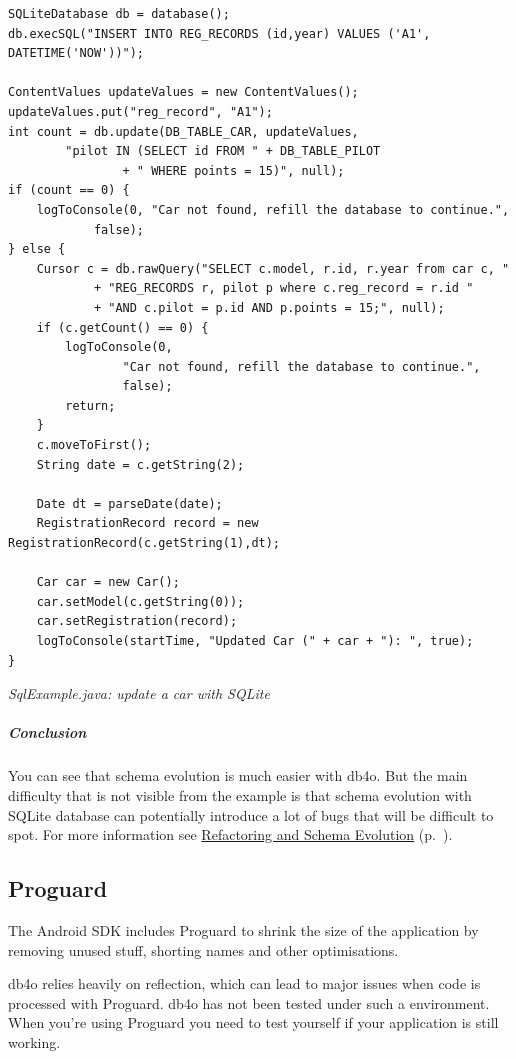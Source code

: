 \begin{lstlisting}
SQLiteDatabase db = database();
db.execSQL("INSERT INTO REG_RECORDS (id,year) VALUES ('A1', DATETIME('NOW'))");

ContentValues updateValues = new ContentValues();
updateValues.put("reg_record", "A1");
int count = db.update(DB_TABLE_CAR, updateValues,
        "pilot IN (SELECT id FROM " + DB_TABLE_PILOT
                + " WHERE points = 15)", null);
if (count == 0) {
    logToConsole(0, "Car not found, refill the database to continue.",
            false);
} else {
    Cursor c = db.rawQuery("SELECT c.model, r.id, r.year from car c, "
            + "REG_RECORDS r, pilot p where c.reg_record = r.id "
            + "AND c.pilot = p.id AND p.points = 15;", null);
    if (c.getCount() == 0) {
        logToConsole(0,
                "Car not found, refill the database to continue.",
                false);
        return;
    }
    c.moveToFirst();
    String date = c.getString(2);
    
    Date dt = parseDate(date);
    RegistrationRecord record = new RegistrationRecord(c.getString(1),dt);
    
    Car car = new Car();
    car.setModel(c.getString(0));
    car.setRegistration(record);
    logToConsole(startTime, "Updated Car (" + car + "): ", true);
}
\end{lstlisting}

{\small\itshape SqlExample.java: update a car with SQLite\par}
\medskip

\subparagraph*{Conclusion}

You can see that schema evolution is much easier with db4o. But the main difficulty that is not visible from the example is that schema evolution with SQLite database can potentially introduce a lot of bugs that will be difficult to spot. For more information see \hyperref[ref:advanced-topics-refactoring-and-schema-evolution]{Refactoring and Schema Evolution} (p.~\pageref{ref:advanced-topics-refactoring-and-schema-evolution}).

\subsection{Proguard}
\label{ref:platform-specific-issues-android-proguard}

The Android SDK includes Proguard to shrink the size of the application by removing unused stuff, shorting names and other optimisations.

db4o relies heavily on reflection, which can lead to major issues when code is processed with Proguard. db4o has not been tested under such a environment. When you're using Proguard you need to test yourself if your application is still working.

